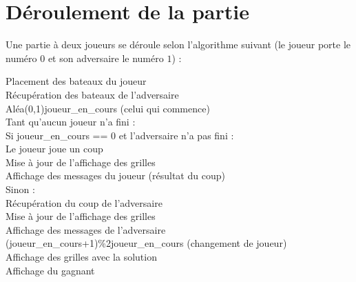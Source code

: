 \newpage
\section{Déroulement de la partie}\label{algo_partie}

Une partie à deux joueurs se déroule selon l'algorithme suivant (le joueur porte le numéro $0$ et son adversaire le numéro $1$) :

\begin{algo1}
Placement des bateaux du joueur\\
Récupération des bateaux de l'adversaire\\
Aléa(0,1)\sto joueur\_en\_cours (celui qui commence)\\
Tant qu'aucun joueur n'a fini :\\
Si joueur\_en\_cours == 0 et l'adversaire n'a pas fini :\\
Le joueur joue un coup\\
Mise à jour de l'affichage des grilles\\
Affichage des messages du joueur (résultat du coup)\\
Sinon :\\
Récupération du coup de l'adversaire\\
Mise à jour de l'affichage des grilles\\
Affichage des messages de l'adversaire\\
(joueur\_en\_cours+1)\%2\sto joueur\_en\_cours (changement de joueur)\\
Affichage des grilles avec la solution\\
Affichage du gagnant\\
\end{algo1}

